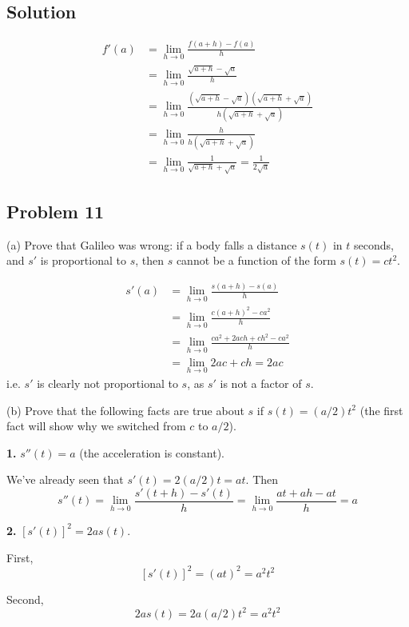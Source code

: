 \subsection*{Solution}
\begin{align*}
  f'(a)&=\lim_{h\to0}\frac{f(a+h)-f(a)}{h}\\
       &=\lim_{h\to0}\frac{\sqrt{a+h}-\sqrt{a}}{h}\\
       &=\lim_{h\to0}\frac{(\sqrt{a+h}-\sqrt{a})(\sqrt{a+h}+\sqrt{a})}{h(\sqrt{a+h}+\sqrt{a})}\\
       &=\lim_{h\to0}\frac{h}{h(\sqrt{a+h}+\sqrt{a})}\\
       &=\lim_{h\to0}\frac{1}{\sqrt{a+h}+\sqrt{a}}=\frac{1}{2\sqrt{a}}
\end{align*}

\subsection*{Problem 11}
(a) Prove that Galileo was wrong: if a body falls a distance $s(t)$ in
$t$ seconds, and $s'$ is proportional to $s$, then $s$ cannot be a
function of the form $s(t)=ct^2$.

\begin{align*}
  s'(a)&=\lim_{h\to0}\frac{s(a+h)-s(a)}{h}\\
       &=\lim_{h\to0}\frac{c(a+h)^2-ca^2}{h}\\
       &=\lim_{h\to0}\frac{ca^2+2ach+ch^2-ca^2}{h}\\
       &=\lim_{h\to0}2ac+ch=2ac
\end{align*}
i.e. $s'$ is clearly not proportional to $s$, as $s'$ is not a factor
of $s$.

\vs

(b) Prove that the following facts are true about $s$ if
$s(t)=(a/2)t^2$ (the first fact will show why we switched from $c$ to
$a/2$).

\vs

\textbf{1.} $s''(t)=a$ (the acceleration is constant).

\vs

We've already seen that $s'(t)=2(a/2)t=at$. Then
\[s''(t)=\lim_{h\to0}\frac{s'(t+h)-s'(t)}{h}=\lim_{h\to0}\frac{at+ah-at}{h}=a\]

\vs

\textbf{2.} $[s'(t)]^2=2as(t)$.

\vs

First,
\[[s'(t)]^2=(at)^2=a^2t^2\]

Second,
\[2as(t)=2a(a/2)t^2=a^2t^2\]

